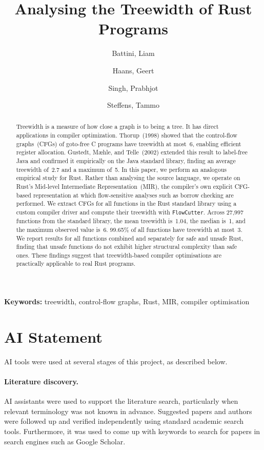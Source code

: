 \documentclass[a4paper, 12pt]{article}
\title{Analysing the Treewidth of Rust Programs}
\author{
  Battini, Liam
  \and
  Haans, Geert
  \and
  Singh, Prabhjot
  \and
  Steffens, Tammo
}
\date{}
\begin{document}
\maketitle

\begin{abstract}
	Treewidth is a measure of how close a graph is to being a tree.
	It has direct applications in compiler optimization.
	Thorup~(1998) showed that the control-flow graphs~(CFGs) of goto-free C programs have treewidth at most~6, enabling efficient register allocation.
	Gustedt, M{\ae}hle, and Telle~(2002) extended this result to label-free Java and confirmed it empirically on the Java standard library, finding an average treewidth of~2.7 and a maximum of~5.
	In this paper, we perform an analogous empirical study for Rust.
	Rather than analysing the source language, we operate on Rust's Mid-level Intermediate Representation~(MIR), the compiler's own explicit CFG-based representation at which flow-sensitive analyses such as borrow checking are performed.
	We extract CFGs for all functions in the Rust standard library using a custom compiler driver and compute their treewidth with \texttt{FlowCutter}.
	Across 27,997 functions from the standard library, the mean treewidth is~1.04, the median is~1, and the maximum observed value is~6.
	99.65\% of all functions have treewidth at most~3.
	We report results for all functions combined and separately for safe and unsafe Rust, finding that unsafe functions do not exhibit higher structural complexity than safe ones.
	These findings suggest that treewidth-based compiler optimisations are practically applicable to real Rust programs.
\end{abstract}

\noindent\textbf{Keywords:} treewidth, control-flow graphs, Rust, MIR, compiler optimisation









\printbibliography

\newpage
\section*{AI Statement}

AI tools were used at several stages of this project, as described below.

\paragraph{Literature discovery.}
AI assistants were used to support the literature search, particularly when relevant terminology was not known in advance.
Suggested papers and authors were followed up and verified independently using standard academic search tools. Furthermore, it was used to come up with keywords to search for papers in search engines such as Google Scholar.
\end{document}
